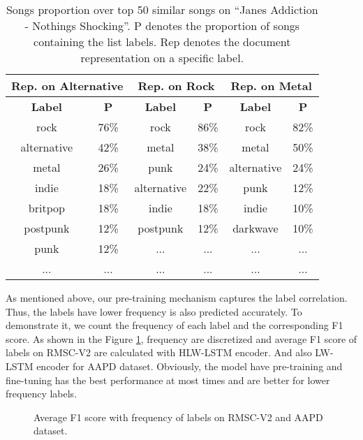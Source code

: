 \documentclass[runningheads]{llncs}
\begin{document}
\begin{table}[htb]
    \centering
    \setlength{\abovecaptionskip}{0.3cm}
    \begin{tabular}{cc|cc|cc}
        \hline
         \multicolumn{2}{c|}{\textbf{Rep. on Alternative}} & \multicolumn{2}{c}{\textbf{Rep. on Rock}} & \multicolumn{2}{c|}{\textbf{Rep. on Metal}} \\ \hline
         \textbf{Label} & \textbf{P} & \textbf{Label} & \textbf{P} & \textbf{Label} & \textbf{P} \\ \hline
        rock & 76\% & rock & 86\% & rock & 82\% \\
        alternative & 42\% & metal & 38\% & metal & 50\% \\
        metal & 26\% & punk & 24\% & alternative & 24\% \\
        indie & 18\% & alternative & 22\% & punk & 12\% \\
        britpop & 18\% & indie & 18\% & indie & 10\% \\
        postpunk & 12\% & postpunk & 12\% & darkwave & 10\% \\
        punk & 12\% & ... & ... & ... & ... \\
        ... & ... & ... & ... & ... & ... \\ 
        \hline
    \end{tabular}
    \caption{Songs proportion over top 50 similar songs on ``Janes Addiction - Nothings Shocking''. P denotes the proportion of songs containing the list labels. Rep denotes the document representation on a specific label.}
    \label{tab:label-prop}
\end{table}

As mentioned above, our pre-training mechanism captures the label correlation. Thus, the labels have lower frequency is also predicted accurately. To demonstrate it, we count the frequency of each label and the corresponding F1 score. As shown in the Figure \ref{fig:rmsc-freq-f1}, frequency are discretized and average F1 score of labels on RMSC-V2 are calculated with HLW-LSTM encoder. And also LW-LSTM encoder for AAPD dataset. Obviously, the model have pre-training and fine-tuning has the best performance at most times and are better for lower frequency labels.
\begin{figure}[htb]
    \centering
    \caption{Average F1 score with frequency of labels on RMSC-V2 and AAPD dataset.}
    \label{fig:rmsc-freq-f1}
\end{figure}
\end{document}
